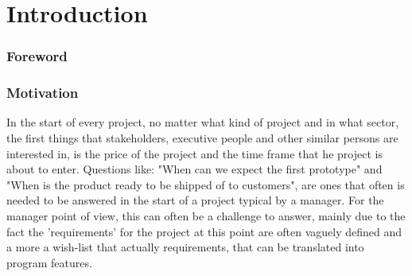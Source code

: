 \part{Introduction}
\section{Foreword}
\section{Motivation}
In the start of every project, no matter what kind of project and in what sector, the first things that stakeholders, executive people and other similar persons are interested in, is the price of the project and the time frame that he project is about to enter. Questions like: "When can we expect the first prototype" and "When is the product ready to be shipped of to customers", are  ones that often is needed to be answered in the start of a project typical by a manager. For the manager point of view, this can often be a challenge to answer, mainly due to the fact the 'requirements' for the project at this point are often vaguely defined and a more a wish-list that actually requirements, that can be translated into program features.  